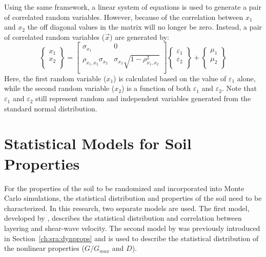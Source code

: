 \documentclass[12pt,oneside]{book}
\begin{document}
Using the same framework, a linear system of equations is used to generate a pair of correlated
random variables.  However, because of the correlation between $x_1$ and $x_2$ the off diagonal
values in the matrix will no longer be zero.  Instead, a pair of correlated random variables
($\vec{x}$) are generated by:
\begin{equation}
    \left\{
        \begin{array}{c}
            x_1 \\
            x_2 \\
        \end{array}
    \right\} 
    =
    \left[
        \begin{array}{cc}
            \sigma_{x_1} & 0 \\
            \rho_{x_1,x_2}\sigma_{x_2} & \sigma_{x_2} \sqrt{1 - \rho_{x_1,x_2}^2} \\ 
        \end{array}
    \right]
    \left\{
        \begin{array}{c}
            \varepsilon_1 \\
            \varepsilon_2 \\
        \end{array}
    \right\}
    + 
    \left\{
        \begin{array}{c}
            \mu_1 \\
            \mu_2 \\
        \end{array}
    \right\}
    \label{eq:linearSystem:correlSol}
\end{equation} %
Here, the first random variable ($x_1$) is calculated based on the value of $\varepsilon_1$ alone,
while the second random variable ($x_2$) is a function of both $\varepsilon_1$ and $\varepsilon_2$.
Note that $\varepsilon_1$ and $\varepsilon_2$ still represent random and independent variables
generated from the standard normal distribution.

\section{Statistical Models for Soil Properties}
For the properties of the soil to be randomized and incorporated into Monte Carlo simulations, the
statistical distribution and properties of the soil need to be characterized.  In this research, two
separate models are used.  The first model, developed by \citet{toro:95}, describes the statistical
distribution and correlation between layering and shear-wave velocity.  The second model by
\citet{darendeli:01} was previously introduced in Section~\ref{ch:sra:dynprops} and is used to
describe the statistical distribution of the nonlinear properties ($G/G_{max}$ and $D$).
\end{document}
